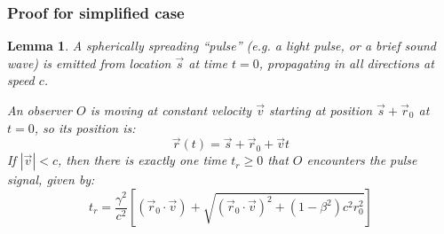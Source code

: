 \documentclass[a4paper]{article}
\theoremstyle{plain}
\newtheorem{lemma}[theorem]{Lemma}
\theoremstyle{definition}
\newcommand{\vect}[1]{\vec{#1}}
\begin{document}
\subsubsection{Proof for simplified case}

\begin{lemma}
\label{lem:IntersectingSpreadingPulse2}
A spherically spreading ``pulse'' (e.g. a light pulse, or a brief
sound wave) is emitted from location $\vect{s}$ at time $t=0$,
propagating in all directions at speed $c$.

An observer $O$ is moving at constant velocity $\vect{v}$ starting at
position $\vect{s} + \vect{r}_0$ at $t=0$, so its position is:
\begin{equation}
\vect{r}(t) = \vect{s} + \vect{r}_0 + \vect{v}t
\end{equation}
If $|\vect{v}| < c$, then there is exactly one time $t_r \geq 0$ that
$O$ encounters the pulse signal, given by:
\begin{equation}
t_r = \frac{\gamma^2}{c^2} \left[ (\vect{r}_0 \cdot \vect{v}) + \sqrt{(\vect{r}_0 \cdot \vect{v})^2 + (1-\beta^2)c^2 r_0^2} \right]
\end{equation}
\end{lemma}
\end{document}
